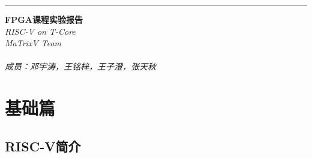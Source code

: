 \documentclass[a4paper, 14pt, oneside]{book} %
\numberwithin{equation}{subsection}
\begin{document}
	\newpage
	\begin{titlepage} %
		
		\raggedleft %
		\rule{1pt}{\textheight} %
		\hspace{0.05\textwidth} %
		\parbox[b]{0.75\textwidth}{ %
			
			{\Huge\bfseries  FPGA课程实验报告}\\[2\baselineskip] %
			{\LARGE\textit{RISC-V on T-Core}}\\[4\baselineskip] %
			{\Large\textit{MaTrixV Team \\ \\ 成员：邓宇涛，王铭梓，王子澄，张天秋}} %
			
			\vspace{0.5\textheight} %
		}
	\end{titlepage}

	\newpage
	\tableofcontents
	
	\newpage
	\section{基础篇}
		\subsection{RISC-V简介}
\end{document}
